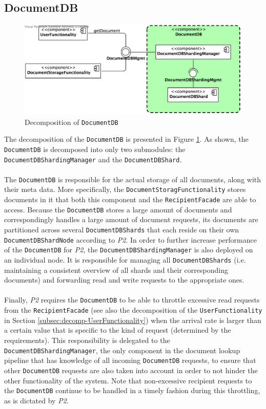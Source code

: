 \documentclass[a4paper,10pt]{article}
\begin{document}
\subsection{DocumentDB}\label{subsec:decomp-DocumentDB}
\begin{figure}[!htp]
	\centering
	\includegraphics[width=1.0\textwidth]{DocumentDB.png}
	\caption{Decomposition of \texttt{DocumentDB}}
	\label{fig:decomp-DocumentDB}
\end{figure}
\FloatBarrier
\noindent
The decomposition of the \texttt{DocumentDB} is presented in Figure \ref{fig:decomp-DocumentDB}. As shown, the \texttt{DocumentDB} is decomposed into only two submodules: the \texttt{DocumentDBShardingManager} and the \texttt{DocumentDBShard}.\\\\
The \texttt{DocumentDB} is responsible for the actual storage of all documents, along with their meta data. More specifically, the \texttt{DocumentStoragFunctionality} stores documents in it that both this component and the \texttt{RecipientFacade} are able to access. Because the \texttt{DocumentDB} stores a large amount of documents and correspondingly handles a large amount of document requests, its documents are partitioned across several \texttt{DocumentDBShards} that each reside on their own \texttt{DocumentDBShardNode} according to \textit{P2}. In order to further increase performance of the \texttt{DocumentDB} for \textit{P2}, the \texttt{DocumentDBShardingManager} is also deployed on an individual node. It is responsible for managing all \texttt{DocumentDBShards} (i.e. maintaining a consistent overview of all shards and their corresponding documents) and forwarding read and write requests to the appropriate ones.\\\\
Finally, \textit{P2} requires the \texttt{DocumentDB} to be able to throttle excessive read requests from the \texttt{RecipientFacade} (see also the decomposition of the \texttt{UserFunctionality} in Section \ref{subsec:decomp-UserFunctionality}) when the arrival rate is larger than a certain value that is specific to the kind of request (determined by the requirements). This responsibility is delegated to the \texttt{DocumentDBShardingManager}, the only component in the document lookup pipeline that has knowledge of all incoming \texttt{DocumentDB} requests, to ensure that other \texttt{DocumentDB} requests are also taken into account in order to not hinder the other functionality of the system. Note that non-excessive recipient requests to the \texttt{DocumentDB} continue to be handled in a timely fashion during this throttling, as is dictated by \textit{P2}.
\end{document}

